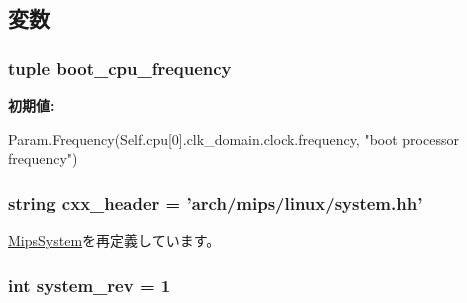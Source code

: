 \subsection{変数}
\hypertarget{classMipsSystem_1_1LinuxMipsSystem_aab5259ecbb88c819a4bf9bd03c47b3d9}{
\subsubsection[{boot\_\-cpu\_\-frequency}]{\setlength{\rightskip}{0pt plus 5cm}tuple boot\_\-cpu\_\-frequency}}
\label{classMipsSystem_1_1LinuxMipsSystem_aab5259ecbb88c819a4bf9bd03c47b3d9}
{\bfseries 初期値:}
\begin{DoxyCode}
Param.Frequency(Self.cpu[0].clk_domain.clock.frequency,
                                         "boot processor frequency")
\end{DoxyCode}
\hypertarget{classMipsSystem_1_1LinuxMipsSystem_a17da7064bc5c518791f0c891eff05fda}{
\subsubsection[{cxx\_\-header}]{\setlength{\rightskip}{0pt plus 5cm}string cxx\_\-header = 'arch/mips/linux/system.hh'}}
\label{classMipsSystem_1_1LinuxMipsSystem_a17da7064bc5c518791f0c891eff05fda}


\hyperlink{classMipsSystem_1_1MipsSystem_a17da7064bc5c518791f0c891eff05fda}{MipsSystem}を再定義しています。\hypertarget{classMipsSystem_1_1LinuxMipsSystem_a261e4081ddd1f0823eccc0f042086c27}{
\subsubsection[{system\_\-rev}]{\setlength{\rightskip}{0pt plus 5cm}int system\_\-rev = 1}}
\label{classMipsSystem_1_1LinuxMipsSystem_a261e4081ddd1f0823eccc0f042086c27}


